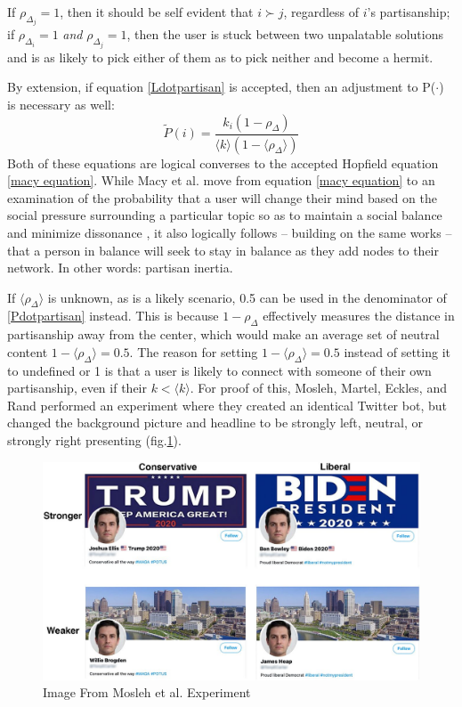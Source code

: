 \documentclass[preprint,review,12pt]{elsarticle}
\begin{document}
If $\rho_{\Delta_j} = 1$, then it should be self evident that $i \succ j$, regardless of $i$'s partisanship; if $\rho_{\Delta_i} = 1$ \textit{and} $\rho_{\Delta_j} = 1$, then the user is stuck between two unpalatable solutions and is as likely to pick either of them as to pick neither and become a hermit. 

By extension, if equation \ref{Ldotpartisan} is accepted, then an adjustment to P($\cdot$) is necessary as well:
\begin{equation}
\label{Pdotpartisan}
        \tilde{P}(i)= \frac{k_i(1-\rho_{\Delta})}{\langle k \rangle  (1-\langle\rho_{\Delta}\rangle) }
\end{equation}
Both of these equations are logical converses to the accepted Hopfield equation \ref{macy equation}. While Macy et al. move from equation \ref{macy equation} to an examination of the probability that a user will change their mind based on the social pressure surrounding a particular topic so as to maintain a social balance and minimize dissonance \cite{macy2003polarization}, it also logically follows -- building on the same works \cite{kitts1999structural,heider1982psychology,cartwright1956structural,hopfield1982neural,hopfield1985neural,nowak1998toward} -- that a person in balance will seek to stay in balance as they add nodes to their network. In other words: partisan inertia.

If $\langle \rho_{\Delta} \rangle$ is unknown, as is a likely scenario,  0.5 can be used in the denominator of \ref{Pdotpartisan} instead. This is because $1 - \rho_{\Delta}$ effectively measures the distance in partisanship away from the center, which would make an average set of neutral content $ 1 - \langle\rho_{\Delta} \rangle = 0.5$. The reason for setting $ 1 - \langle\rho_{\Delta} \rangle = 0.5$ instead of setting it to undefined or 1 is that a user is likely to connect with someone of their own partisanship, even if their $k < \langle k \rangle$. For proof of this, Mosleh, Martel, Eckles, and Rand performed an experiment where they created an identical Twitter bot, but changed the background picture and headline to be strongly left, neutral, or strongly right presenting (fig.\ref{fig:Mosleh Image}).
 \begin{figure}[htp]
    \centering
    \includegraphics[width=12cm]{mosleh_image.jpg}
    \caption{Image From Mosleh et al. Experiment \cite{mosleh2020shared}}
    \label{fig:Mosleh Image}
\end{figure}
\end{document}
